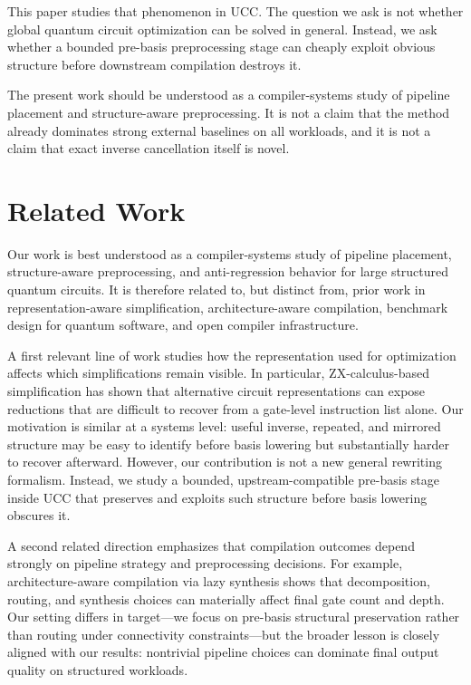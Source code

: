 \documentclass[11pt]{article}
\begin{document}
This paper studies that phenomenon in UCC. The question we ask is not whether global quantum circuit optimization can be solved in general. Instead, we ask whether a bounded pre-basis preprocessing stage can cheaply exploit obvious structure before downstream compilation destroys it.

The present work should be understood as a compiler-systems study of pipeline placement and structure-aware preprocessing. It is not a claim that the method already dominates strong external baselines on all workloads, and it is not a claim that exact inverse cancellation itself is novel.

\section{Related Work}

Our work is best understood as a compiler-systems study of pipeline placement, structure-aware preprocessing, and anti-regression behavior for large structured quantum circuits. It is therefore related to, but distinct from, prior work in representation-aware simplification, architecture-aware compilation, benchmark design for quantum software, and open compiler infrastructure.

A first relevant line of work studies how the representation used for optimization affects which simplifications remain visible. In particular, ZX-calculus-based simplification has shown that alternative circuit representations can expose reductions that are difficult to recover from a gate-level instruction list alone. Our motivation is similar at a systems level: useful inverse, repeated, and mirrored structure may be easy to identify before basis lowering but substantially harder to recover afterward. However, our contribution is not a new general rewriting formalism. Instead, we study a bounded, upstream-compatible pre-basis stage inside UCC that preserves and exploits such structure before basis lowering obscures it.

A second related direction emphasizes that compilation outcomes depend strongly on pipeline strategy and preprocessing decisions. For example, architecture-aware compilation via lazy synthesis shows that decomposition, routing, and synthesis choices can materially affect final gate count and depth. Our setting differs in target---we focus on pre-basis structural preservation rather than routing under connectivity constraints---but the broader lesson is closely aligned with our results: nontrivial pipeline choices can dominate final output quality on structured workloads.
\end{document}
